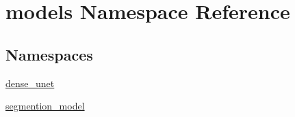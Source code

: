 \hypertarget{namespacemodels}{}\section{models Namespace Reference}
\label{namespacemodels}
\subsection*{Namespaces}
\begin{DoxyCompactItemize}
\item 
 \mbox{\hyperlink{namespacemodels_1_1dense__unet}{dense\+\_\+unet}}
\item 
 \mbox{\hyperlink{namespacemodels_1_1segmention__model}{segmention\+\_\+model}}
\end{DoxyCompactItemize}
